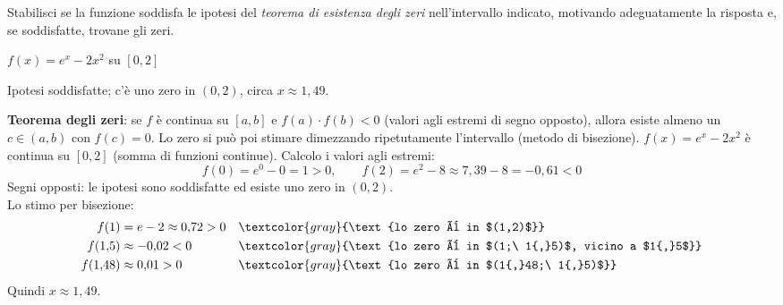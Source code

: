 \begin{question}[ID=3.1, subtitle={Teorema degli zeri per $e^x-2x^2$ su $[0,2]$}, tags={continuità, teorema degli zeri}, difficulty=media]
Stabilisci se la funzione soddisfa le ipotesi del \textit{teorema di esistenza degli zeri} nell'intervallo indicato, motivando adeguatamente la risposta e, se soddisfatte, trovane gli zeri.
\begin{center}
    $f(x) = e^x - 2x^2$ su $[0,2]$
\end{center}
\begin{solution}
Ipotesi soddisfatte; c'è uno zero in $(0,2)$, circa $x\approx1{,}49$.
\end{solution}
\begin{explanation}
\textbf{Teorema degli zeri}: se $f$ è continua su $[a,b]$ e $f(a)\cdot f(b)<0$ (valori agli estremi di segno opposto), allora esiste almeno un $c\in(a,b)$ con $f(c)=0$. Lo zero si può poi stimare dimezzando ripetutamente l'intervallo (metodo di bisezione).
$f(x)=e^x-2x^2$ è continua su $[0,2]$ (somma di funzioni continue). Calcolo i valori agli estremi:
\[ f(0)=e^0-0=1>0, \qquad f(2)=e^2-8\approx7{,}39-8=-0{,}61<0 \]
Segni opposti: le ipotesi sono soddisfatte ed esiste uno zero in $(0,2)$. \\
Lo stimo per bisezione:
\[\begin{aligned}
f(1) &= e-2\approx0{,}72>0 && \textcolor{gray}{\text{lo zero è in $(1,2)$}}\\
f(1{,}5) &\approx -0{,}02<0 && \textcolor{gray}{\text{lo zero è in $(1;\ 1{,}5)$, vicino a $1{,}5$}}\\
f(1{,}48) &\approx 0{,}01>0 && \textcolor{gray}{\text{lo zero è in $(1{,}48;\ 1{,}5)$}}
\end{aligned}\]
Quindi $x\approx1{,}49$.
\end{explanation}
\end{question}


